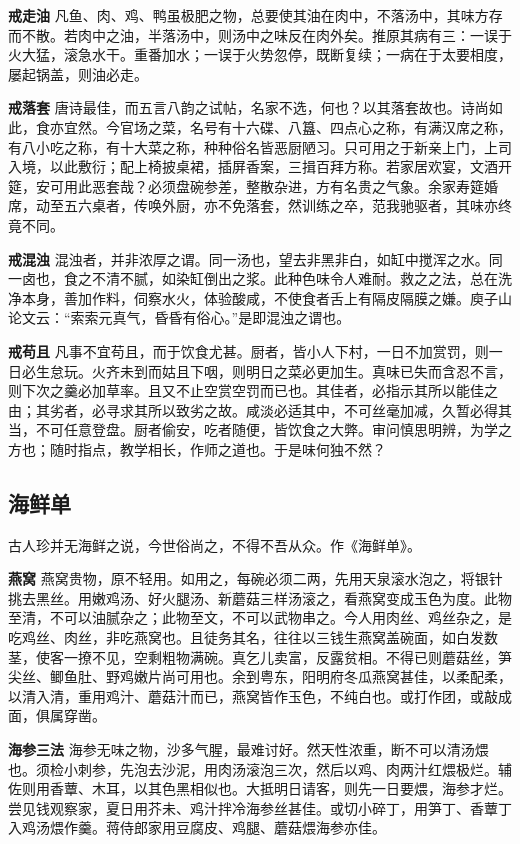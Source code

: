 \documentclass[]{article}
\begin{document}
\textbf{戒走油}
凡鱼、肉、鸡、鸭虽极肥之物，总要使其油在肉中，不落汤中，其味方存而不散。若肉中之油，半落汤中，则汤中之味反在肉外矣。推原其病有三：一误于火大猛，滚急水干。重番加水；一误于火势忽停，既断复续；一病在于太要相度，屡起锅盖，则油必走。

\textbf{戒落套}
唐诗最佳，而五言八韵之试帖，名家不选，何也？以其落套故也。诗尚如此，食亦宜然。今官场之菜，名号有十六碟、八簋、四点心之称，有满汉席之称，有八小吃之称，有十大菜之称，种种俗名皆恶厨陋习。只可用之于新亲上门，上司入境，以此敷衍；配上椅披桌裙，插屏香案，三揖百拜方称。若家居欢宴，文酒开筵，安可用此恶套哉？必须盘碗参差，整散杂进，方有名贵之气象。余家寿筵婚席，动至五六桌者，传唤外厨，亦不免落套，然训练之卒，范我驰驱者，其味亦终竟不同。

\textbf{戒混浊}
混浊者，并非浓厚之谓。同一汤也，望去非黑非白，如缸中搅浑之水。同一卤也，食之不清不腻，如染缸倒出之浆。此种色味令人难耐。救之之法，总在洗净本身，善加作料，伺察水火，体验酸咸，不使食者舌上有隔皮隔膜之嫌。庾子山论文云：``索索元真气，昏昏有俗心。''是即混浊之谓也。

\textbf{戒苟且}
凡事不宜苟且，而于饮食尤甚。厨者，皆小人下村，一日不加赏罚，则一日必生怠玩。火齐未到而姑且下咽，则明日之菜必更加生。真味已失而含忍不言，则下次之羹必加草率。且又不止空赏空罚而已也。其佳者，必指示其所以能佳之由；其劣者，必寻求其所以致劣之故。咸淡必适其中，不可丝毫加减，久暂必得其当，不可任意登盘。厨者偷安，吃者随便，皆饮食之大弊。审问慎思明辨，为学之方也；随时指点，教学相长，作师之道也。于是味何独不然？

\hypertarget{header-n13}{%
\subsection{海鲜单}\label{header-n13}}

古人珍并无海鲜之说，今世俗尚之，不得不吾从众。作《海鲜单》。

\textbf{燕窝}
燕窝贵物，原不轻用。如用之，每碗必须二两，先用天泉滚水泡之，将银针挑去黑丝。用嫩鸡汤、好火腿汤、新蘑菇三样汤滚之，看燕窝变成玉色为度。此物至清，不可以油腻杂之；此物至文，不可以武物串之。今人用肉丝、鸡丝杂之，是吃鸡丝、肉丝，非吃燕窝也。且徒务其名，往往以三钱生燕窝盖碗面，如白发数茎，使客一撩不见，空剩粗物满碗。真乞儿卖富，反露贫相。不得已则蘑菇丝，笋尖丝、鲫鱼肚、野鸡嫩片尚可用也。余到粤东，阳明府冬瓜燕窝甚佳，以柔配柔，以清入清，重用鸡汁、蘑菇汁而已，燕窝皆作玉色，不纯白也。或打作团，或敲成面，俱属穿凿。

\textbf{海参三法}
海参无味之物，沙多气腥，最难讨好。然天性浓重，断不可以清汤煨也。须检小刺参，先泡去沙泥，用肉汤滚泡三次，然后以鸡、肉两汁红煨极烂。辅佐则用香蕈、木耳，以其色黑相似也。大抵明日请客，则先一日要煨，海参才烂。尝见钱观察家，夏日用芥未、鸡汁拌冷海参丝甚佳。或切小碎丁，用笋丁、香蕈丁入鸡汤煨作羹。蒋侍郎家用豆腐皮、鸡腿、蘑菇煨海参亦佳。
\end{document}
